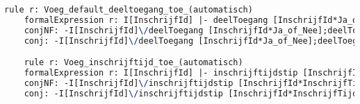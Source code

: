\begin{lstlisting}[language=TeX]
    rule r: Voeg_default_deeltoegang_toe_(automatisch)
    formalExpression r: I[InschrijfId] |- deelToegang [InschrijfId*Ja_of_Nee];deelToegang [InschrijfId*Ja_of_Nee]~
    conjNF: -I[InschrijfId]\/deelToegang [InschrijfId*Ja_of_Nee];deelToegang [InschrijfId*Ja_of_Nee]~
    conj: -I[InschrijfId]\/deelToegang [InschrijfId*Ja_of_Nee];deelToegang [InschrijfId*Ja_of_Nee]~

    rule r: Voeg_inschrijftijd_toe_(automatisch)
    formalExpression r: I[InschrijfId] |- inschrijftijdstip [InschrijfId*InschrijfTijdstip];inschrijftijdstip [InschrijfId*InschrijfTijdstip]~
    conjNF: -I[InschrijfId]\/inschrijftijdstip [InschrijfId*InschrijfTijdstip];inschrijftijdstip [InschrijfId*InschrijfTijdstip]~
    conj: -I[InschrijfId]\/inschrijftijdstip [InschrijfId*InschrijfTijdstip];inschrijftijdstip [InschrijfId*InschrijfTijdstip]~
\end{lstlisting}